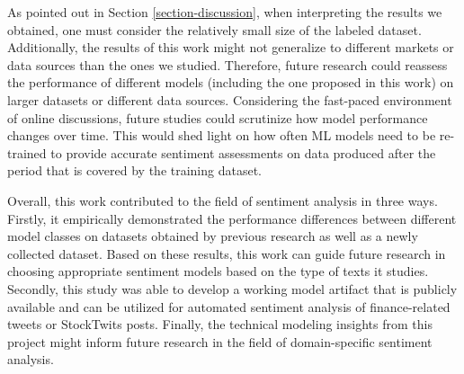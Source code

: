 As pointed out in Section \ref{section-discussion}, when interpreting the results we obtained, one must consider the relatively small size of the labeled dataset. Additionally,  the results of this work might not generalize to different markets or data sources than the ones we studied. Therefore, future research could reassess the performance of different models (including the one proposed in this work) on larger datasets or different data sources. Considering the fast-paced environment of online discussions, future studies could scrutinize how model performance changes over time. This would shed light on how often ML models need to be re-trained to provide accurate sentiment assessments on data produced after the period that is covered by the training dataset.

Overall, this work contributed to the field of sentiment analysis in three ways. Firstly, it empirically demonstrated the performance differences between different model classes on datasets obtained by previous research as well as a newly collected dataset. Based on these results, this work can guide future research in choosing appropriate sentiment models based on the type of texts it studies. Secondly, this study was able to develop a working model artifact that is publicly available and can be utilized for automated sentiment analysis of finance-related tweets or StockTwits posts. Finally, the technical modeling insights from this project might inform future research in the field of domain-specific sentiment analysis.\newline
